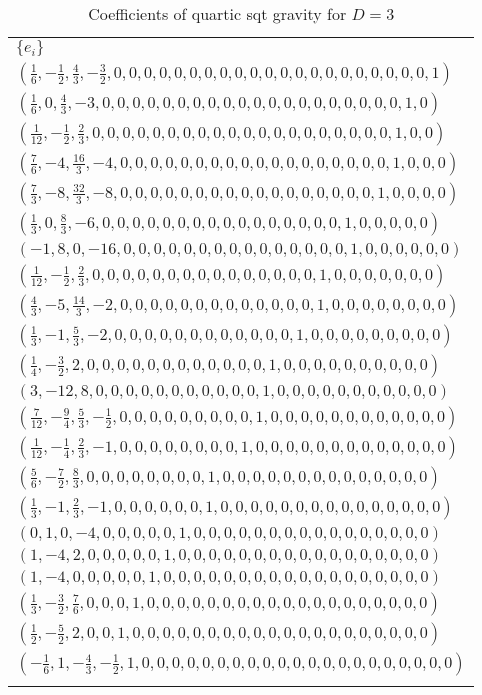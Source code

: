 \documentclass[a4paper,11pt]{article}
\begin{document}
\begin{longtable}{|l|}
    \hline
    $\{e_i\}$ \\
    $(\frac{1}{6},-\frac{1}{2},\frac{4}{3},-\frac{3}{2},0,0,0,0,0,0,0,0,0,0,0,0,0,0,0,0,0,0,0,0,0,1)$ \\
    $(\frac{1}{6},0,\frac{4}{3},-3,0,0,0,0,0,0,0,0,0,0,0,0,0,0,0,0,0,0,0,0,1,0)$ \\
    $(\frac{1}{12},-\frac{1}{2},\frac{2}{3},0,0,0,0,0,0,0,0,0,0,0,0,0,0,0,0,0,0,0,0,1,0,0)$ \\
    $(\frac{7}{6},-4,\frac{16}{3},-4,0,0,0,0,0,0,0,0,0,0,0,0,0,0,0,0,0,0,1,0,0,0)$ \\
    $(\frac{7}{3},-8,\frac{32}{3},-8,0,0,0,0,0,0,0,0,0,0,0,0,0,0,0,0,0,1,0,0,0,0)$ \\
    $(\frac{1}{3},0,\frac{8}{3},-6,0,0,0,0,0,0,0,0,0,0,0,0,0,0,0,0,1,0,0,0,0,0)$ \\
    $(-1,8,0,-16,0,0,0,0,0,0,0,0,0,0,0,0,0,0,0,1,0,0,0,0,0,0)$ \\
    $(\frac{1}{12},-\frac{1}{2},\frac{2}{3},0,0,0,0,0,0,0,0,0,0,0,0,0,0,0,1,0,0,0,0,0,0,0)$ \\
    $(\frac{4}{3},-5,\frac{14}{3},-2,0,0,0,0,0,0,0,0,0,0,0,0,0,1,0,0,0,0,0,0,0,0)$ \\
    $(\frac{1}{3},-1,\frac{5}{3},-2,0,0,0,0,0,0,0,0,0,0,0,0,1,0,0,0,0,0,0,0,0,0)$ \\
    $(\frac{1}{4},-\frac{3}{2},2,0,0,0,0,0,0,0,0,0,0,0,0,1,0,0,0,0,0,0,0,0,0,0)$ \\
    $(3,-12,8,0,0,0,0,0,0,0,0,0,0,0,1,0,0,0,0,0,0,0,0,0,0,0)$ \\
    $(\frac{7}{12},-\frac{9}{4},\frac{5}{3},-\frac{1}{2},0,0,0,0,0,0,0,0,0,1,0,0,0,0,0,0,0,0,0,0,0,0)$ \\
    $(\frac{1}{12},-\frac{1}{4},\frac{2}{3},-1,0,0,0,0,0,0,0,0,1,0,0,0,0,0,0,0,0,0,0,0,0,0)$ \\
    $(\frac{5}{6},-\frac{7}{2},\frac{8}{3},0,0,0,0,0,0,0,0,1,0,0,0,0,0,0,0,0,0,0,0,0,0,0)$ \\
    $(\frac{1}{3},-1,\frac{2}{3},-1,0,0,0,0,0,0,1,0,0,0,0,0,0,0,0,0,0,0,0,0,0,0)$ \\
    $(0,1,0,-4,0,0,0,0,0,1,0,0,0,0,0,0,0,0,0,0,0,0,0,0,0,0)$ \\
    $(1,-4,2,0,0,0,0,0,1,0,0,0,0,0,0,0,0,0,0,0,0,0,0,0,0,0)$ \\
    $(1,-4,0,0,0,0,0,1,0,0,0,0,0,0,0,0,0,0,0,0,0,0,0,0,0,0)$ \\
    $(\frac{1}{3},-\frac{3}{2},\frac{7}{6},0,0,0,1,0,0,0,0,0,0,0,0,0,0,0,0,0,0,0,0,0,0,0)$ \\
    $(\frac{1}{2},-\frac{5}{2},2,0,0,1,0,0,0,0,0,0,0,0,0,0,0,0,0,0,0,0,0,0,0,0)$ \\
    $(-\frac{1}{6},1,-\frac{4}{3},-\frac{1}{2},1,0,0,0,0,0,0,0,0,0,0,0,0,0,0,0,0,0,0,0,0,0)$ \\
    \hline
    \caption{Coefficients of quartic \ac{sqt} gravity for $D = 3$}
    \label{tab:quartic-qtg-sol-3d}
\end{longtable}
\end{document}
